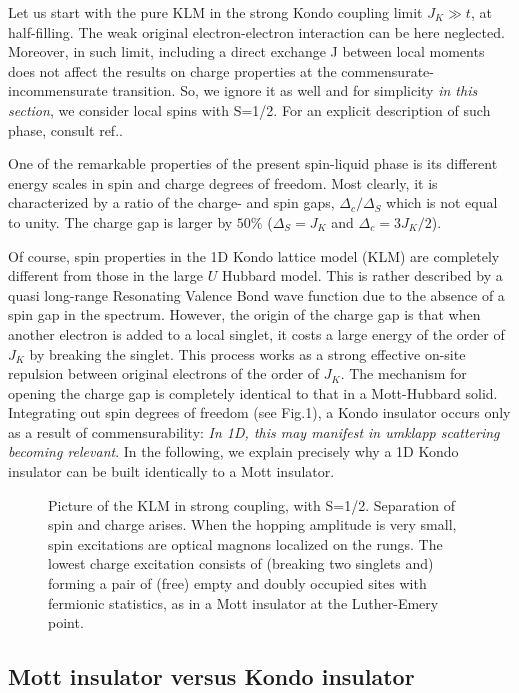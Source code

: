 Let 
us start with the pure KLM in the strong Kondo coupling limit
$J_K\gg t$, at half-filling.
The weak original electron-electron interaction can be here
neglected. Moreover, in such limit, including a direct exchange J
between local moments does not
affect the results on charge properties at
the commensurate-incommensurate transition. So, we
ignore it as well and for simplicity \emph{in this section}, we consider 
local spins with S=1/2. For an explicit description
of such phase, consult ref.\cite{Ueda_review}.

One of the remarkable properties of the present spin-liquid phase is its
different energy scales in spin and charge degrees of freedom. 
Most clearly, it is characterized by a ratio
of the charge- and spin gaps, $\Delta_c/\Delta_S$ which is not equal to
unity. The charge gap is larger
by $50\%$ ($\Delta_S=J_K$ and $\Delta_c=3J_K/2$).

Of course, spin properties in
the 1D Kondo lattice model (KLM) are completely
different from those in the large $U$ Hubbard model. This is rather
described by a quasi
long-range Resonating Valence Bond 
wave function due to the absence of a spin gap in the spectrum. 
However, the 
origin of the charge gap is that when
another electron is added to a local singlet, it costs a large energy of
the order of $J_K$ by breaking the singlet. 
This process works as a strong effective
 on-site repulsion between original electrons of the order of
$J_K$. The mechanism 
for opening the charge gap
is completely identical to that in a Mott-Hubbard solid\cite{Schulz1,Giam1}.
Integrating out spin degrees of freedom (see Fig.1), a 
Kondo insulator occurs only as a result of 
commensurability: \emph{In 1D, this may manifest
in umklapp scattering becoming relevant}\cite{Schulz2}. In the following, we
explain precisely 
why a 1D Kondo insulator can be built identically to a Mott insulator.
\begin{figure}
\centerline{}
\vskip 0.5cm
\caption{Picture of the KLM in strong coupling, with S=1/2. 
Separation of spin and charge
arises. When the hopping amplitude is very small,
spin excitations are optical magnons localized on the rungs. 
The lowest charge excitation consists of (breaking two singlets and) forming
a pair of (free) empty and doubly occupied sites with 
fermionic statistics, as in a Mott insulator at the Luther-Emery point.}
\end{figure} 


\subsection{Mott insulator versus Kondo insulator}

